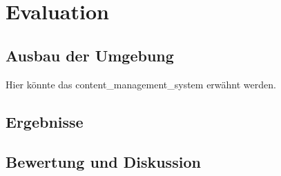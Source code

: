 \chapter{Evaluation}
\section{Ausbau der Umgebung}
Hier könnte das \Gls{content_management_system} erwähnt werden.
\section{Ergebnisse}
\section{Bewertung und Diskussion}
